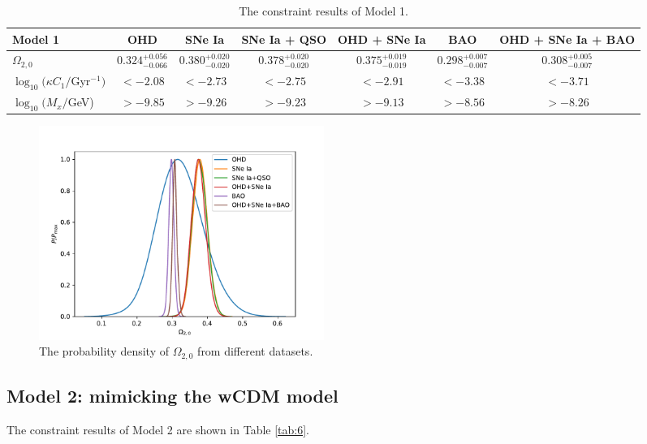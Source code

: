 \documentclass[twocolumn]{aastex631}
\begin{document}
   \begin{table}[htbp]
      \centering
      \begin{tabular}{lcccccc}
         \hline\hline
         Model 1 & OHD & SNe Ia & SNe Ia + QSO 
         & OHD + SNe Ia & BAO & OHD + SNe Ia + BAO \\
         \hline
         $\Omega_{2,0}$ & $0.324_{-0.066}^{+0.056}$ & $0.380_{-0.020}^{+0.020}$
          & $0.378_{-0.020}^{+0.020}$ & $0.375_{-0.019}^{+0.019}$
          & $0.298_{-0.007}^{+0.007}$ & $0.308_{-0.007}^{+0.005}$ \\
         $\log_{10}(\kappa C_1/$Gyr${}^{-1})$ & $<-2.08$ & $<-2.73$ & $<-2.75$
         & $<-2.91$ & $<-3.38$  & $<-3.71$ \\
         $\log_{10}(M_x/$GeV) & $>-9.85$ & $>-9.26$ & $>-9.23$
         & $>-9.13$ & $>-8.56$ & $>-8.26$ \\
         \hline
      \end{tabular}
      \caption{The constraint results of Model 1.}
      \label{tab:5}
   \end{table}

   \begin{figure}[htbp]
      \centering
      \includegraphics[width=0.45\textwidth]{pdf_1.pdf}
      \caption{The probability density of $\Omega_{2,0}$ from different
      datasets.}
      \label{fig:6}
   \end{figure}

\subsection{Model 2: mimicking the wCDM model}

   The constraint results of Model 2 are shown in Table \ref{tab:6}.
\end{document}
